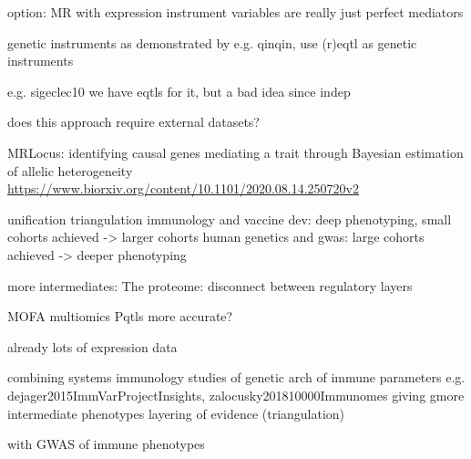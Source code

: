 \begin{outline}

    option: MR with expression 
        instrument variables are really just perfect mediators

        genetic instruments
        as demonstrated by e.g. qinqin, use (r)eqtl as genetic instruments

        e.g. sigeclec10
        we have eqtls for it, but a bad idea since indep

        does this approach require external datasets?

        MRLocus: identifying causal genes mediating a trait through Bayesian estimation of allelic heterogeneity
        \url{https://www.biorxiv.org/content/10.1101/2020.08.14.250720v2}

unification
    triangulation
    immunology and vaccine dev: deep phenotyping, small cohorts achieved -> larger cohorts
    human genetics and gwas: large cohorts achieved -> deeper phenotyping

    more intermediates:
        The proteome: disconnect between regulatory layers


    MOFA
    multiomics
        Pqtls more accurate?

    already lots of expression data

    combining systems immunology studies of genetic arch of immune parameters
            e.g. dejager2015ImmVarProjectInsights, zalocusky201810000Immunomes
        giving gmore intermediate phenotypes
        layering of evidence (triangulation)

    with GWAS of immune phenotypes


\end{outline}
